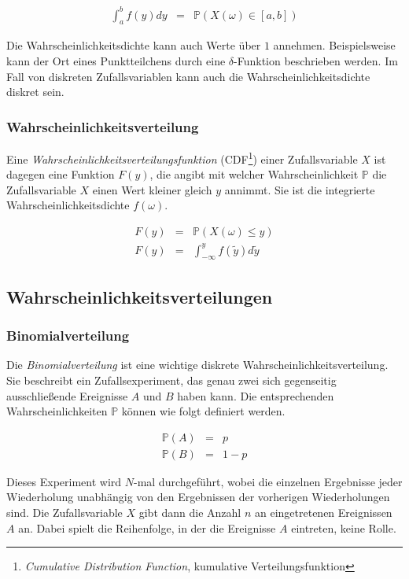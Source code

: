 \documentclass[12pt,a4paper]{scrartcl}
\numberwithin{equation}{section} %
\renewcommand{\[}{} %
\renewcommand{\]}{\noindent} %
\begin{document}
\begin{eqnarray}
	\int_{a}^{b} f(y) dy &=& \mathbb P(X(\omega) \in [a,b])
	\label{eq:wahrscheinlichkeitsdichte}
\end{eqnarray}

\noindent
Die Wahrscheinlichkeitsdichte kann auch Werte über $1$ annehmen. Beispielsweise kann der Ort eines Punktteilchens durch eine $\delta$-Funktion beschrieben werden. Im Fall von diskreten Zufallsvariablen kann auch die Wahrscheinlichkeitsdichte diskret sein.

\subsubsection{Wahrscheinlichkeitsverteilung}
\label{Wahrscheinlichkeitsverteilung}
Eine \emph{Wahrscheinlichkeitsverteilungsfunktion} (CDF\footnote{\emph{Cumulative Distribution Function}, kumulative Verteilungsfunktion}) einer Zufallsvariable $X$ ist dagegen eine Funktion $F(y)$, die angibt mit welcher Wahrscheinlichkeit $\mathbb P$ die Zufallsvariable $X$ einen Wert kleiner gleich $y$ annimmt. Sie ist die integrierte Wahrscheinlichkeitsdichte $f(\omega)$.

\begin{eqnarray}
	F(y) &=& \mathbb P(X(\omega) \leq y) \\
	F(y) &=& \int_{- \infty}^{y} f(\tilde{y}) d\tilde{y}
\end{eqnarray}

\subsection{Wahrscheinlichkeitsverteilungen}
\label{Wahrscheinlichkeitsverteilungen}

\subsubsection{Binomialverteilung}
\label{Binomialverteilung}
Die \emph{Binomialverteilung} ist eine wichtige diskrete Wahrscheinlichkeitsverteilung. Sie beschreibt ein Zufallsexperiment, das genau zwei sich gegenseitig ausschließende Ereignisse $A$ und $B$ haben kann. Die entsprechenden Wahrscheinlichkeiten $\mathbb P$ können wie folgt definiert werden.

\begin{eqnarray}
	\mathbb P(A) &=& p \\
	\mathbb P(B) &=& 1 - p
\end{eqnarray}

\noindent
Dieses Experiment wird $N$-mal durchgeführt, wobei die einzelnen Ergebnisse jeder Wiederholung unabhängig von den Ergebnissen der vorherigen Wiederholungen sind. Die Zufallsvariable $X$ gibt dann die Anzahl $n$ an eingetretenen Ereignissen $A$ an. Dabei spielt die Reihenfolge, in der die Ereignisse $A$ eintreten, keine Rolle.
\end{document}
